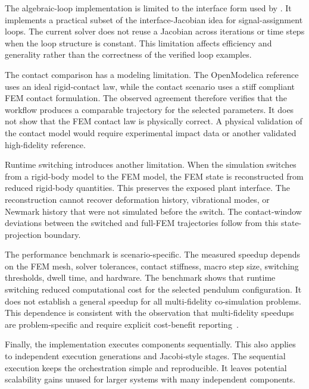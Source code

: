 The algebraic-loop implementation is limited to the interface form used by \syssimx{}.
It implements a practical subset of the interface-Jacobian idea for signal-assignment loops.
The current solver does not reuse a Jacobian across iterations or time steps when the loop structure is constant.
This limitation affects efficiency and generality rather than the correctness of the verified loop examples.

The contact comparison has a modeling limitation.
The OpenModelica reference uses an ideal rigid-contact law, while the \syssimx{} contact scenario uses a stiff compliant FEM contact formulation.
The observed agreement therefore verifies that the workflow produces a comparable trajectory for the selected parameters.
It does not show that the FEM contact law is physically correct.
A physical validation of the contact model would require experimental impact data or another validated high-fidelity reference.

Runtime switching introduces another limitation.
When the simulation switches from a rigid-body model to the FEM model, the FEM state is reconstructed from reduced rigid-body quantities.
This preserves the exposed plant interface.
The reconstruction cannot recover deformation history, vibrational modes, or Newmark history that were not simulated before the switch.
The contact-window deviations between the switched and full-FEM trajectories follow from this state-projection boundary.

The performance benchmark is scenario-specific.
The measured speedup depends on the FEM mesh, solver tolerances, contact stiffness, macro step size, switching thresholds, dwell time, and hardware.
The benchmark shows that runtime switching reduced computational cost for the selected pendulum configuration.
It does not establish a general speedup for all multi-fidelity co-simulation problems.
This dependence is consistent with the observation that multi-fidelity speedups are problem-specific and require explicit cost-benefit reporting~\cite{fernandez-godino_review_2023}.

Finally, the implementation executes components sequentially.
This also applies to independent execution generations and Jacobi-style stages.
The sequential execution keeps the orchestration simple and reproducible.
It leaves potential scalability gains unused for larger systems with many independent components.
